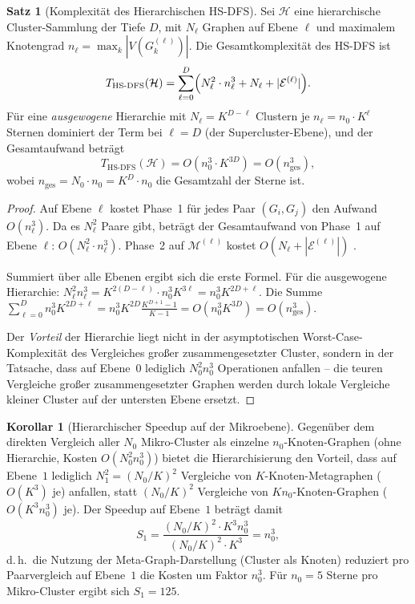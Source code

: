 ﻿\documentclass[a4paper,12pt]{report}
\theoremstyle{definition}
\newtheorem{satz}{Satz}
\newtheorem{korollar}{Korollar}
\begin{document}
\begin{satz}[Komplexität des Hierarchischen HS-DFS]
\label{satz:hsdfs_komplexitaet}
Sei $\mathcal{H}$ eine hierarchische Cluster-Sammlung der Tiefe $D$, mit $N_\ell$ Graphen auf Ebene $\ell$ und maximalem Knotengrad $n_\ell = \max_k |V(G^{(\ell)}_k)|$. Die Gesamtkomplexität des HS-DFS ist
\[
T_\mathrm{HS\text{-}DFS}(\mathcal{H}) = \sum_{\ell=0}^{D}
\Bigl( N_\ell^2 \cdot n_\ell^3 + N_\ell + |\mathcal{E}^{(\ell)}| \Bigr).
\]
Für eine \emph{ausgewogene} Hierarchie mit $N_\ell = K^{D-\ell}$ Clustern je $n_\ell = n_0 \cdot K^\ell$ Sternen dominiert der Term bei $\ell = D$ (der Supercluster-Ebene), und der Gesamtaufwand beträgt
\[
T_\mathrm{HS\text{-}DFS}(\mathcal{H}) = O\!\left(n_0^3 \cdot K^{3D}\right) = O\!\left(n_\mathrm{ges}^3\right),
\]
wobei $n_\mathrm{ges} = N_0 \cdot n_0 = K^D \cdot n_0$ die Gesamtzahl der Sterne ist.
\end{satz}

\begin{proof}
Auf Ebene $\ell$ kostet Phase~1 für jedes Paar $(G_i, G_j)$ den Aufwand $O(n_\ell^3)$. Da es $N_\ell^2$ Paare gibt, beträgt der Gesamtaufwand von Phase~1 auf Ebene $\ell$: $O(N_\ell^2 \cdot n_\ell^3)$. Phase~2 auf $\mathcal{M}^{(\ell)}$ kostet $O(N_\ell + |\mathcal{E}^{(\ell)}|)$ \cite{cormen2009}.

Summiert über alle Ebenen ergibt sich die erste Formel. Für die ausgewogene Hierarchie: $N_\ell^2 n_\ell^3 = K^{2(D-\ell)} \cdot n_0^3 K^{3\ell} = n_0^3 K^{2D+\ell}$. Die Summe $\sum_{\ell=0}^D n_0^3 K^{2D+\ell} = n_0^3 K^{2D} \frac{K^{D+1}-1}{K-1} = O(n_0^3 K^{3D}) = O(n_\mathrm{ges}^3)$.

Der \emph{Vorteil} der Hierarchie liegt nicht in der asymptotischen Worst-Case-Komplexität des Vergleiches großer zusammengesetzter Cluster, sondern in der Tatsache, dass auf Ebene~$0$ lediglich $N_0^2 n_0^3$ Operationen anfallen -- die teuren Vergleiche großer zusammengesetzter Graphen werden durch lokale Vergleiche kleiner Cluster auf der untersten Ebene ersetzt.
\end{proof}

\begin{korollar}[Hierarchischer Speedup auf der Mikroebene]
\label{kor:speedup}
Gegenüber dem direkten Vergleich aller $N_0$ Mikro-Cluster als einzelne $n_0$-Knoten-Graphen (ohne Hierarchie, Kosten $O(N_0^2 n_0^3)$) bietet die Hierarchisierung den Vorteil, dass auf Ebene~$1$ lediglich $N_1^2 = (N_0/K)^2$ Vergleiche von $K$-Knoten-Metagraphen ($O(K^3)$ je) anfallen, statt $(N_0/K)^2$ Vergleiche von $K n_0$-Knoten-Graphen ($O(K^3 n_0^3)$ je). Der Speedup auf Ebene~$1$ beträgt damit
\[
S_1 = \frac{(N_0/K)^2 \cdot K^3 n_0^3}{(N_0/K)^2 \cdot K^3} = n_0^3,
\]
d.\,h.\ die Nutzung der Meta-Graph-Darstellung (Cluster als Knoten) reduziert pro Paarvergleich auf Ebene~$1$ die Kosten um Faktor $n_0^3$. Für $n_0 = 5$ Sterne pro Mikro-Cluster ergibt sich $S_1 = 125$.
\end{korollar}
\end{document}
